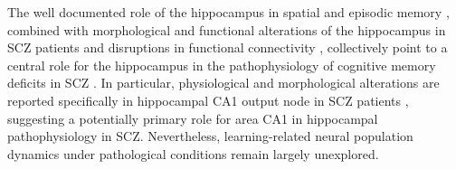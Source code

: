 The well documented role of the hippocampus in spatial and episodic memory \citep{Burgess2002, Buzsaki2013, Dickerson2010, Eichenbaum2000, Eichenbaum2014}, combined with morphological and functional alterations of the hippocampus in SCZ patients \citep{Narr2004, Vita2006, Witthaus2010, Zhou2008, Heckers2010, Meyer-Lindenberg2005, Tamminga2010, Collin2011, Debbane2006, Flahault2012} and disruptions in functional connectivity \citep{Harrison2001, Hutcheson2015}, collectively point to a central role for the hippocampus in the pathophysiology of cognitive memory deficits in SCZ \citep{Achim2005, Bast2011}. In particular, physiological and morphological alterations are reported specifically in hippocampal CA1 output node in SCZ patients \citep{Narr2004, Zierhut2013}, suggesting a potentially primary role for area CA1 in hippocampal pathophysiology in SCZ. Nevertheless, learning-related neural population dynamics under pathological conditions remain largely unexplored.

